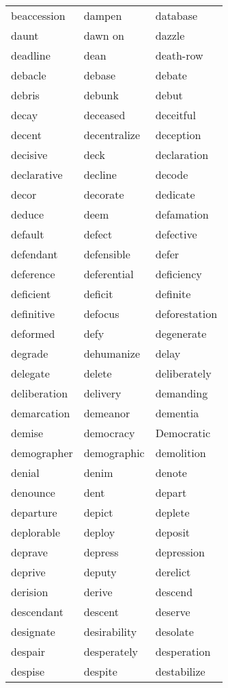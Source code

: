 \documentclass{minimal}
\begin{document}
\begin{longtable}{p{2.7cm}@{\hskip 0.2cm}p{2.7cm}@{\hskip 0.2cm}p{2.7cm}}
beaccession & dampen & database \\
daunt & dawn on & dazzle \\
deadline & dean & death-row \\
debacle & debase & debate \\
debris & debunk & debut \\
decay & deceased & deceitful \\
decent & decentralize & deception \\
decisive & deck & declaration \\
declarative & decline & decode \\
decor & decorate & dedicate \\
deduce & deem & defamation \\
default & defect & defective \\
defendant & defensible & defer \\
deference & deferential & deficiency \\
deficient & deficit & definite \\
definitive & defocus & deforestation \\
deformed & defy & degenerate \\
degrade & dehumanize & delay \\
delegate & delete & deliberately \\
deliberation & delivery & demanding \\
demarcation & demeanor & dementia \\
demise & democracy & Democratic \\
demographer & demographic & demolition \\
denial & denim & denote \\
denounce & dent & depart \\
departure & depict & deplete \\
deplorable & deploy & deposit \\
deprave & depress & depression \\
deprive & deputy & derelict \\
derision & derive & descend \\
descendant & descent & deserve \\
designate & desirability & desolate \\
despair & desperately & desperation \\
despise & despite & destabilize \\

\end{longtable}
\end{document}
